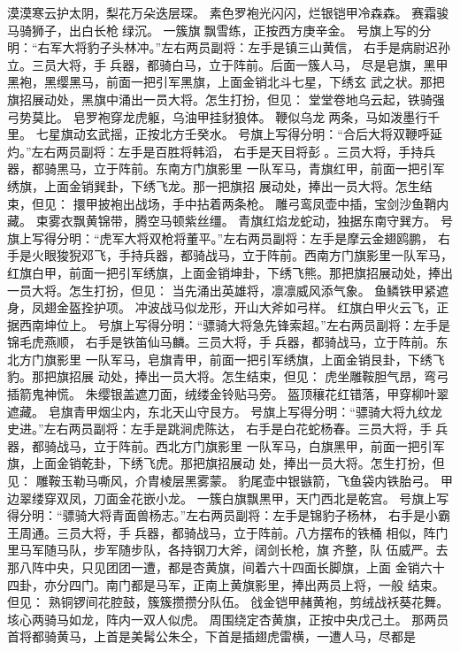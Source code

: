 漠漠寒云护太阴，梨花万朵迭层琛。
素色罗袍光闪闪，烂银铠甲冷森森。
赛霜骏马骑狮子，出白长枪绿沉。
一簇旗飘雪练，正按西方庚辛金。
号旗上写的分明：“右军大将豹子头林冲。”左右两员副将：左手是镇三山黄信，
右手是病尉迟孙立。三员大将，手兵器，都骑白马，立于阵前。后面一簇人马，
尽是皂旗，黑甲黑袍，黑缨黑马，前面一把引军黑旗，上面金销北斗七星，下绣玄
武之状。那把旗招展动处，黑旗中涌出一员大将。怎生打扮，但见：
堂堂卷地乌云起，铁骑强弓势莫比。
皂罗袍穿龙虎躯，乌油甲挂豺狼体。
鞭似乌龙两条，马如泼墨行千里。
七星旗动玄武摇，正按北方壬癸水。
号旗上写得分明：“合后大将双鞭呼延灼。”左右两员副将：左手是百胜将韩滔，
右手是天目将彭。三员大将，手持兵器，都骑黑马，立于阵前。东南方门旗影里
一队军马，青旗红甲，前面一把引军绣旗，上面金销巽卦，下绣飞龙。那一把旗招
展动处，捧出一员大将。怎生结束，但见：
擐甲披袍出战场，手中拈着两条枪。
雕弓鸾凤壶中插，宝剑沙鱼鞘内藏。
束雾衣飘黄锦带，腾空马顿紫丝缰。
青旗红焰龙蛇动，独据东南守巽方。
号旗上写得分明：“虎军大将双枪将董平。”左右两员副将：左手是摩云金翅鸥鹏，
右手是火眼狻猊邓飞，手持兵器，都骑战马，立于阵前。西南方门旗影里一队军马，
红旗白甲，前面一把引军绣旗，上面金销坤卦，下绣飞熊。那把旗招展动处，捧出
一员大将。怎生打扮，但见：
当先涌出英雄将，凛凛威风添气象。
鱼鳞铁甲紧遮身，凤翅金盔拴护项。
冲波战马似龙形，开山大斧如弓样。
红旗白甲火云飞，正据西南坤位上。
号旗上写得分明：“骠骑大将急先锋索超。”左右两员副将：左手是锦毛虎燕顺，
右手是铁笛仙马麟。三员大将，手兵器，都骑战马，立于阵前。东北方门旗影里
一队军马，皂旗青甲，前面一把引军绣旗，上面金销艮卦，下绣飞豹。那把旗招展
动处，捧出一员大将。怎生结束，但见：
虎坐雕鞍胆气昂，弯弓插箭鬼神慌。
朱缨银盖遮刀面，绒缕金铃贴马旁。
盔顶穰花红错落，甲穿柳叶翠遮藏。
皂旗青甲烟尘内，东北天山守艮方。
号旗上写得分明：“骠骑大将九纹龙史进。”左右两员副将：左手是跳涧虎陈达，
右手是白花蛇杨春。三员大将，手兵器，都骑战马，立于阵前。西北方门旗影里
一队军马，白旗黑甲，前面一把引军旗，上面金销乾卦，下绣飞虎。那把旗招展动
处，捧出一员大将。怎生打扮，但见：
雕鞍玉勒马嘶风，介胄棱层黑雾蒙。
豹尾壶中银镞箭，飞鱼袋内铁胎弓。
甲边翠缕穿双凤，刀面金花嵌小龙。
一簇白旗飘黑甲，天门西北是乾宫。
号旗上写得分明：“骠骑大将青面兽杨志。”左右两员副将：左手是锦豹子杨林，
右手是小霸王周通。三员大将，手兵器，都骑战马，立于阵前。八方摆布的铁桶
相似，阵门里马军随马队，步军随步队，各持钢刀大斧，阔剑长枪，旗齐整，队
伍威严。去那八阵中央，只见团团一遭，都是杏黄旗，间着六十四面长脚旗，上面
金销六十四卦，亦分四门。南门都是马军，正南上黄旗影里，捧出两员上将，一般
结束。但见：
熟铜锣间花腔鼓，簇簇攒攒分队伍。
戗金铠甲赭黄袍，剪绒战袄葵花舞。
垓心两骑马如龙，阵内一双人似虎。
周围绕定杏黄旗，正按中央戊己土。
那两员首将都骑黄马，上首是美髯公朱仝，下首是插翅虎雷横，一遭人马，尽都是
